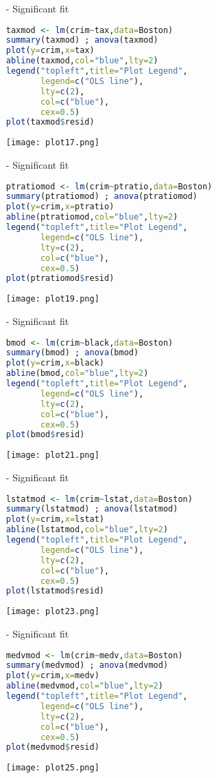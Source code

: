 \documentclass[11pt]{report}
\begin{document}
\begin{itemize}
\begin{itemize}
\item[-] Significant fit

\begin{lstlisting}[language=R]
taxmod <- lm(crim~tax,data=Boston)
summary(taxmod) ; anova(taxmod) 
plot(y=crim,x=tax) 
abline(taxmod,col="blue",lty=2)
legend("topleft",title="Plot Legend",
       legend=c("OLS line"),
       lty=c(2),
       col=c("blue"),
       cex=0.5)
plot(taxmod$resid)
\end{lstlisting}
\texttt{[image: plot17.png]}

\item[-] Significant fit

\begin{lstlisting}[language=R]
ptratiomod <- lm(crim~ptratio,data=Boston)
summary(ptratiomod) ; anova(ptratiomod) 
plot(y=crim,x=ptratio) 
abline(ptratiomod,col="blue",lty=2)
legend("topleft",title="Plot Legend",
       legend=c("OLS line"),
       lty=c(2),
       col=c("blue"),
       cex=0.5)
plot(ptratiomod$resid)
\end{lstlisting}
\texttt{[image: plot19.png]}

\item[-] Significant fit

\begin{lstlisting}[language=R]
bmod <- lm(crim~black,data=Boston)
summary(bmod) ; anova(bmod) 
plot(y=crim,x=black) 
abline(bmod,col="blue",lty=2)
legend("topleft",title="Plot Legend",
       legend=c("OLS line"),
       lty=c(2),
       col=c("blue"),
       cex=0.5)
plot(bmod$resid)
\end{lstlisting}

\texttt{[image: plot21.png]}

\item[-] Significant fit

\begin{lstlisting}[language=R]
lstatmod <- lm(crim~lstat,data=Boston)
summary(lstatmod) ; anova(lstatmod) 
plot(y=crim,x=lstat) 
abline(lstatmod,col="blue",lty=2)
legend("topleft",title="Plot Legend",
       legend=c("OLS line"),
       lty=c(2),
       col=c("blue"),
       cex=0.5)
plot(lstatmod$resid)
\end{lstlisting}
\texttt{[image: plot23.png]}

\item[-] Significant fit

\begin{lstlisting}[language=R]
medvmod <- lm(crim~medv,data=Boston)
summary(medvmod) ; anova(medvmod) 
plot(y=crim,x=medv) 
abline(medvmod,col="blue",lty=2)
legend("topleft",title="Plot Legend",
       legend=c("OLS line"),
       lty=c(2),
       col=c("blue"),
       cex=0.5)
plot(medvmod$resid)
\end{lstlisting}
\texttt{[image: plot25.png]}


\end{itemize}
\end{itemize}
\end{document}
